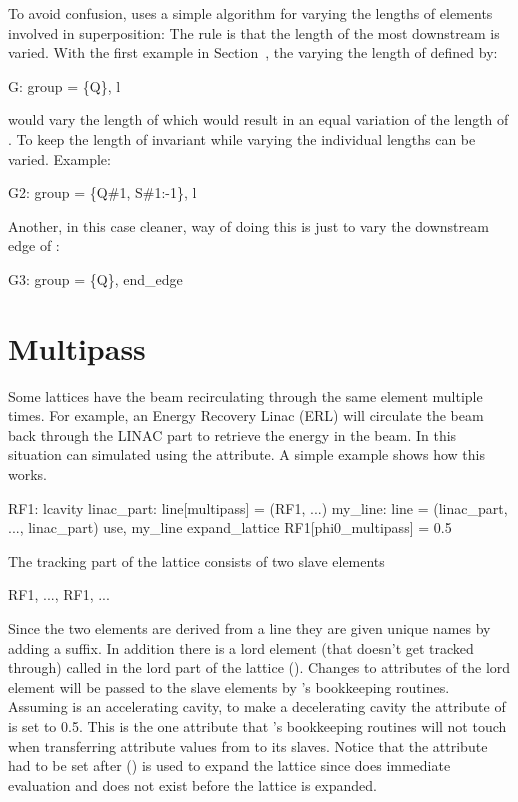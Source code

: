 To avoid confusion, \bmad uses a simple algorithm for varying the
lengths of elements involved in superposition: The rule is that the
length of the most downstream  is varied.
With the first example in Section~, the  
varying the length of  defined by:
\begin{example}
  G: group = \{Q\}, l
\end{example}
would vary the length of  which would result in an equal
variation of the length of . To keep the length of 
invariant while varying  the individual  lengths
can be varied. Example:
\begin{example}
  G2: group = \{Q{\#}1, S{\#}1:-1\}, l
\end{example}
Another, in this case cleaner, way of doing this is just to vary the
downstream edge of :
\begin{example}
  G3: group = \{Q\}, end_edge
\end{example}

\section{Multipass}
\label{s:multipass}

Some lattices have the beam recirculating through the same element
multiple times. For example, an Energy Recovery Linac (ERL) will
circulate the beam back through the LINAC part to retrieve the energy
in the beam. In \bmad this situation can simulated using the
 attribute. A simple example shows how this works.
\begin{example}
  RF1: lcavity
  linac_part: line[multipass] = (RF1, ...)
  my_line: line = (linac_part, ..., linac_part)
  use, my_line
  expand_lattice
  RF1[phi0_multipass] = 0.5
\end{example}
The tracking part of the lattice consists of two slave elements
\begin{example}
  RF1, ..., RF1, ...
\end{example}
Since the two elements are derived from a  line they are
given unique names by adding a  suffix. In addition there is
a lord element (that doesn't get tracked through) called  in
the lord part of the lattice (). Changes to
attributes of the lord  element will be passed to the slave
elements by \bmad's bookkeeping routines. Assuming  is an
accelerating cavity, to make  a decelerating cavity the
 attribute of  is set to 0.5. This is
the one attribute that \bmad's bookkeeping routines will not touch
when transferring attribute values from  to its slaves. Notice
that the  attribute had to be set after
 () is used to expand the lattice
since \bmad does immediate evaluation and  does not exist
before the lattice is expanded.


